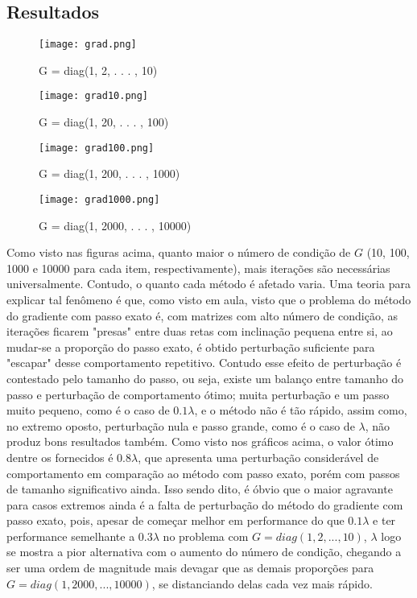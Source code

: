 \documentclass[a4paper, 12pt]{article}
\begin{document}
\subsection{Resultados}
\begin{figure}[H]
  \centering
  \texttt{[image: grad.png]}
  \caption{G = diag(1, 2, . . . , 10)}
\end{figure}
\begin{figure}[H]
  \centering
  \texttt{[image: grad10.png]}
  \caption{G = diag(1, 20, . . . , 100)}
\end{figure}
\begin{figure}[H]
  \centering
  \texttt{[image: grad100.png]}
  \caption{G = diag(1, 200, . . . , 1000)}
\end{figure}
\begin{figure}[H]
  \centering
  \texttt{[image: grad1000.png]}
  \caption{G = diag(1, 2000, . . . , 10000)}
\end{figure}
Como visto nas figuras acima, quanto maior o número de condição de $G$ (10, 100, 1000 e 10000 para cada item, respectivamente), mais iterações são necessárias universalmente. Contudo, o quanto cada método é afetado varia. Uma teoria para explicar tal fenômeno é que, como visto em aula, visto que o problema do método do gradiente com passo exato é, com matrizes com alto número de condição, as iterações ficarem "presas" entre duas retas com inclinação pequena entre si, ao mudar-se a proporção do passo exato, é obtido perturbação suficiente para "escapar" desse comportamento repetitivo. Contudo esse efeito de perturbação é contestado pelo tamanho do passo, ou seja, existe um balanço entre tamanho do passo e perturbação de comportamento ótimo; muita perturbação e um passo muito pequeno, como é o caso de $0.1\lambda$, e o método não é tão rápido, assim como, no extremo oposto, perturbação nula e passo grande, como é o caso de $\lambda$, não produz bons resultados também. Como visto nos gráficos acima, o valor ótimo dentre os fornecidos é $0.8\lambda$, que apresenta uma perturbação considerável de comportamento em comparação ao método com passo exato, porém com passos de tamanho significativo ainda. Isso sendo dito, é óbvio que o maior agravante para casos extremos ainda é a falta de perturbação do método do gradiente com passo exato, pois, apesar de começar melhor em performance do que $0.1\lambda$ e ter performance semelhante a $0.3\lambda$ no problema com $G = diag(1, 2, . . . , 10)$, $\lambda$ logo se mostra a pior alternativa com o aumento do número de condição, chegando a ser uma ordem de magnitude mais devagar que as demais proporções para $G = diag(1, 2000, . . . , 10000)$, se distanciando delas cada vez mais rápido.
\end{document}
